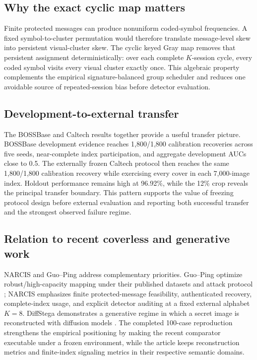 \subsection{Why the exact cyclic map matters}

Finite protected messages can produce nonuniform coded-symbol frequencies. A fixed symbol-to-cluster permutation would therefore translate message-level skew into persistent visual-cluster skew. The cyclic keyed Gray map removes that persistent assignment deterministically: over each complete $K$-session cycle, every coded symbol visits every visual cluster exactly once. This algebraic property complements the empirical signature-balanced group scheduler and reduces one avoidable source of repeated-session bias before detector evaluation.

\subsection{Development-to-external transfer}

The BOSSBase and Caltech results together provide a useful transfer picture. BOSSBase development evidence reaches 1,800/1,800 calibration recoveries across five seeds, near-complete index participation, and aggregate development AUCs close to 0.5. The externally frozen Caltech protocol then reaches the same 1,800/1,800 calibration recovery while exercising every cover in each 7,000-image index. Holdout performance remains high at 96.92\%, while the 12\% crop reveals the principal transfer boundary. This pattern supports the value of freezing protocol design before external evaluation and reporting both successful transfer and the strongest observed failure regime.

\subsection{Relation to recent coverless and generative work}

NARCIS and Guo--Ping address complementary priorities. Guo--Ping optimize robust/high-capacity mapping under their published datasets and attack protocol \cite{guo2026capacity}; NARCIS emphasizes finite protected-message feasibility, authenticated recovery, complete-index usage, and explicit detector auditing at a fixed external alphabet $K=8$. DiffStega demonstrates a generative regime in which a secret image is reconstructed with diffusion models \cite{yang2024diffstega}. The completed 100-case reproduction strengthens the empirical positioning by making the recent comparator executable under a frozen environment, while the article keeps reconstruction metrics and finite-index signaling metrics in their respective semantic domains.

